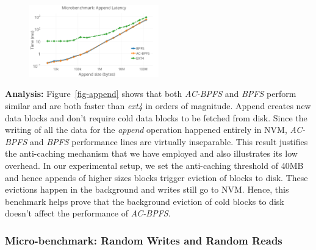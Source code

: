 \begin{figure}
\centering
\vspace{-0.1in}
\includegraphics[width=0.5\textwidth]{figs/append.png}
\vspace{-0.1in}
\end{figure}

\textbf{Analysis:} Figure~\ref{fig-append} shows that both \textit{AC-BPFS} and \textit{BPFS} perform similar and are both faster than \textit{ext4} in orders of magnitude. Append creates new data blocks and don't require cold data blocks to be fetched from disk. Since the writing of all the data for the \textit{append} operation happened entirely in NVM, \textit{AC-BPFS} and \textit{BPFS} performance lines are virtually inseparable. This result justifies the anti-caching mechanism that we have employed and also illustrates its low overhead. In our experimental setup, we set the anti-caching threshold of 40MB and hence appends of higher sizes blocks trigger eviction of blocks to disk. These evictions happen in the background and writes still go to NVM. Hence, this benchmark helps prove that the background eviction of cold blocks to disk doesn't affect the performance of \textit{AC-BPFS}.

\subsubsection{Micro-benchmark: Random Writes and Random Reads}

